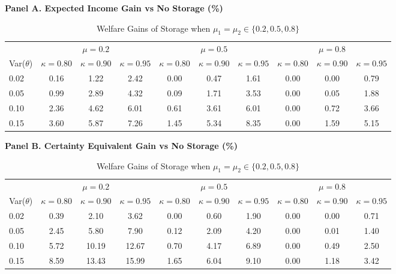 
\begin{table}[ht!]\centering
\caption{Welfare Gains of Storage when $\mu_1=\mu_2\in\{0.2,0.5,0.8\}$}
\label{tab:mu_cases_storage_outcomes}
\begin{threeparttable}
\vspace{0.35em}
\noindent\textbf{Panel A. Expected Income Gain vs No Storage (\%)}
\vspace{0.25em}
\begin{tabular}{l|ccc|ccc|ccc}
\toprule
 & \multicolumn{3}{c|}{$\mu=0.2$} & \multicolumn{3}{c|}{$\mu=0.5$} & \multicolumn{3}{c}{$\mu=0.8$} \\
Var($\theta$) & $\kappa=0.80$ & $\kappa=0.90$ & $\kappa=0.95$ & $\kappa=0.80$ & $\kappa=0.90$ & $\kappa=0.95$ & $\kappa=0.80$ & $\kappa=0.90$ & $\kappa=0.95$ \\
\midrule
0.02 & 0.16 & 1.22 & 2.42 & 0.00 & 0.47 & 1.61 & 0.00 & 0.00 & 0.79 \\
0.05 & 0.99 & 2.89 & 4.32 & 0.09 & 1.71 & 3.53 & 0.00 & 0.05 & 1.88 \\
0.10 & 2.36 & 4.62 & 6.01 & 0.61 & 3.61 & 6.01 & 0.00 & 0.72 & 3.66 \\
0.15 & 3.60 & 5.87 & 7.26 & 1.45 & 5.34 & 8.35 & 0.00 & 1.59 & 5.15 \\
\bottomrule
\end{tabular}

\vspace{0.35em}
\noindent\textbf{Panel B. Certainty Equivalent Gain vs No Storage (\%)}
\vspace{0.25em}
\begin{tabular}{l|ccc|ccc|ccc}
\toprule
 & \multicolumn{3}{c|}{$\mu=0.2$} & \multicolumn{3}{c|}{$\mu=0.5$} & \multicolumn{3}{c}{$\mu=0.8$} \\
Var($\theta$) & $\kappa=0.80$ & $\kappa=0.90$ & $\kappa=0.95$ & $\kappa=0.80$ & $\kappa=0.90$ & $\kappa=0.95$ & $\kappa=0.80$ & $\kappa=0.90$ & $\kappa=0.95$ \\
\midrule
0.02 & 0.39 & 2.10 & 3.62 & 0.00 & 0.60 & 1.90 & 0.00 & 0.00 & 0.71 \\
0.05 & 2.45 & 5.80 & 7.90 & 0.12 & 2.09 & 4.20 & 0.00 & 0.01 & 1.40 \\
0.10 & 5.72 & 10.19 & 12.67 & 0.70 & 4.17 & 6.89 & 0.00 & 0.49 & 2.50 \\
0.15 & 8.59 & 13.43 & 15.99 & 1.65 & 6.04 & 9.10 & 0.00 & 1.18 & 3.42 \\
\bottomrule
\end{tabular}


\end{threeparttable}
\end{table}
